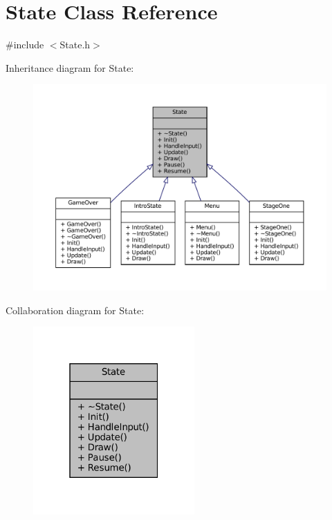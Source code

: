 \hypertarget{classState}{}\section{State Class Reference}
\label{classState}


{\ttfamily \#include $<$State.\+h$>$}



Inheritance diagram for State\+:\nopagebreak
\begin{figure}[H]
\begin{center}
\leavevmode
\includegraphics[width=350pt]{classState__inherit__graph}
\end{center}
\end{figure}


Collaboration diagram for State\+:\nopagebreak
\begin{figure}[H]
\begin{center}
\leavevmode
\includegraphics[width=175pt]{classState__coll__graph}
\end{center}
\end{figure}
